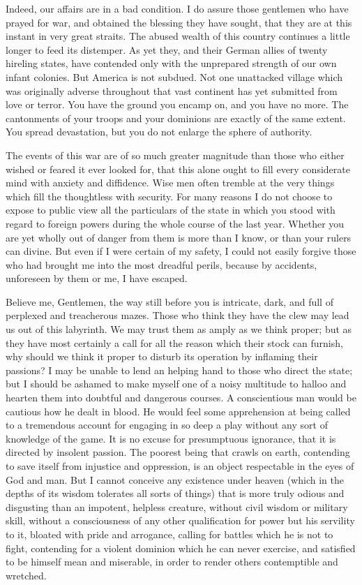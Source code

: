 Indeed, our affairs are in a bad condition. I do assure those gentlemen who have prayed for war, and obtained the blessing they have sought, that they are at this instant in very great straits. The abused wealth of this country continues a little longer to feed its distemper. As yet they, and their German allies of twenty hireling states, have contended only with the unprepared strength of our own infant colonies. But America is not subdued. Not one unattacked village which was originally adverse throughout that vast continent has yet submitted from love or terror. You have the ground you encamp on, and you have no more. The cantonments of your troops and your dominions are exactly of the same extent. You spread devastation, but you do not enlarge the sphere of authority.

The events of this war are of so much greater magnitude than those who either wished or feared it ever looked for, that this alone ought to fill every considerate mind with anxiety and diffidence. Wise men often tremble at the very things which fill the thoughtless with security. For many reasons I do not choose to expose to public view all the particulars of the state in which you stood with regard to foreign powers during the whole course of the last year. Whether you are yet wholly out of danger from them is more than I know, or than your rulers can divine. But even if I were certain of my safety, I could not easily forgive those who had brought me into the most dreadful perils, because by accidents, unforeseen by them or me, I have escaped.

Believe me, Gentlemen, the way still before you is intricate, dark, and full of perplexed and treacherous mazes. Those who think they have the clew may lead us out of this labyrinth. We may trust them as amply as we think proper; but as they have most certainly a call for all the reason which their stock can furnish, why should we think it proper to disturb its operation by inflaming their passions? I may be unable to lend an helping hand to those who direct the state; but I should be ashamed to make myself one of a noisy multitude to halloo and hearten them into doubtful and dangerous courses. A conscientious man would be cautious how he dealt in blood. He would feel some apprehension at being called to a tremendous account for engaging in so deep a play without any sort of knowledge of the game. It is no excuse for presumptuous ignorance, that it is directed by insolent passion. The poorest being that crawls on earth, contending to save itself from injustice and oppression, is an object respectable in the eyes of God and man. But I cannot conceive any existence under heaven (which in the depths of its wisdom tolerates all sorts of things) that is more truly odious and disgusting than an impotent, helpless creature, without civil wisdom or military skill, without a consciousness of any other qualification for power but his servility to it, bloated with pride and arrogance, calling for battles which he is not to fight, contending for a violent dominion which he can never exercise, and satisfied to be himself mean and miserable, in order to render others contemptible and wretched.

